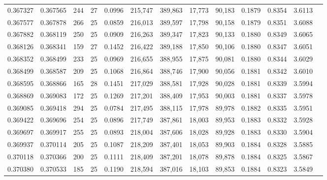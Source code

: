 \begin{tabular}{rrrrrrrrrrrrr}
0.367327 & 0.367565 &   244 &  27 &                                     0.0996 & 215,747 & 389,863 &  17,773 &  90,183 & 0.1879 & 0.8354 & 3.6113 \\
0.367577 & 0.367878 &   266 &  25 &                                     0.0859 & 216,013 & 389,597 &  17,798 &  90,158 & 0.1879 & 0.8351 & 3.6088 \\
0.367882 & 0.368119 &   250 &  25 &                                     0.0909 & 216,263 & 389,347 &  17,823 &  90,133 & 0.1880 & 0.8349 & 3.6065 \\
0.368126 & 0.368341 &   159 &  27 &                                     0.1452 & 216,422 & 389,188 &  17,850 &  90,106 & 0.1880 & 0.8347 & 3.6051 \\
0.368352 & 0.368499 &   233 &  25 &                                     0.0969 & 216,655 & 388,955 &  17,875 &  90,081 & 0.1880 & 0.8344 & 3.6029 \\
0.368499 & 0.368587 &   209 &  25 &                                     0.1068 & 216,864 & 388,746 &  17,900 &  90,056 & 0.1881 & 0.8342 & 3.6010 \\
0.368595 & 0.368866 &   165 &  28 &                                     0.1451 & 217,029 & 388,581 &  17,928 &  90,028 & 0.1881 & 0.8339 & 3.5994 \\
0.368869 & 0.369083 &   172 &  25 &                                     0.1269 & 217,201 & 388,409 &  17,953 &  90,003 & 0.1881 & 0.8337 & 3.5978 \\
0.369085 & 0.369418 &   294 &  25 &                                     0.0784 & 217,495 & 388,115 &  17,978 &  89,978 & 0.1882 & 0.8335 & 3.5951 \\
0.369422 & 0.369696 &   254 &  25 &                                     0.0896 & 217,749 & 387,861 &  18,003 &  89,953 & 0.1883 & 0.8332 & 3.5928 \\
0.369697 & 0.369917 &   255 &  25 &                                     0.0893 & 218,004 & 387,606 &  18,028 &  89,928 & 0.1883 & 0.8330 & 3.5904 \\
0.369937 & 0.370114 &   205 &  25 &                                     0.1087 & 218,209 & 387,401 &  18,053 &  89,903 & 0.1884 & 0.8328 & 3.5885 \\
0.370118 & 0.370366 &   200 &  25 &                                     0.1111 & 218,409 & 387,201 &  18,078 &  89,878 & 0.1884 & 0.8325 & 3.5867 \\
0.370380 & 0.370533 &   185 &  25 &                                     0.1190 & 218,594 & 387,016 &  18,103 &  89,853 & 0.1884 & 0.8323 & 3.5849 \\

\end{tabular}
